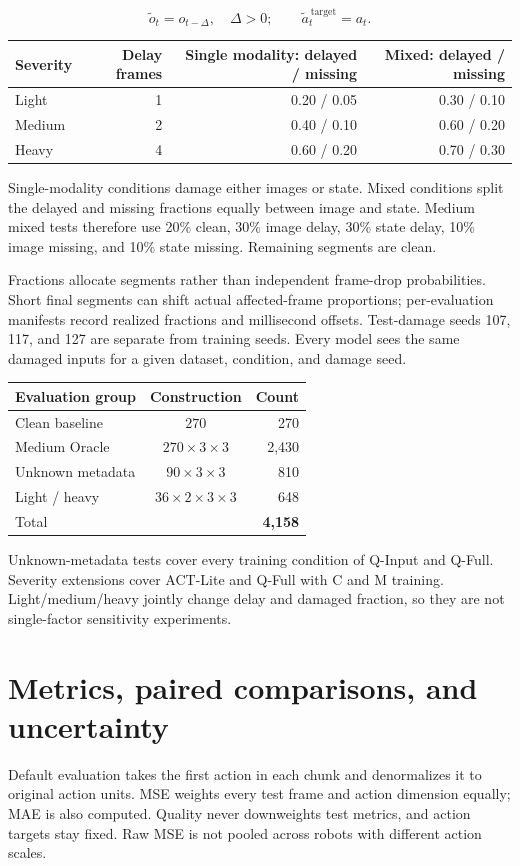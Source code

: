 \documentclass[11pt,a4paper]{article}
\begin{document}
\[\widetilde{o}_t=o_{t-\Delta},\quad \Delta>0;\qquad \widetilde{a}^{\,\mathrm{target}}_t=a_t.\]
\begin{center}
\footnotesize
\begin{tabular}{lrrr}
\toprule
Severity & Delay frames & Single modality: delayed / missing & Mixed: delayed / missing \\
\midrule
Light & 1 & 0.20 / 0.05 & 0.30 / 0.10 \\
Medium & 2 & 0.40 / 0.10 & 0.60 / 0.20 \\
Heavy & 4 & 0.60 / 0.20 & 0.70 / 0.30 \\
\bottomrule
\end{tabular}
\end{center}
Single-modality conditions damage either images or state. Mixed conditions split the delayed and missing fractions equally between image and state. Medium mixed tests therefore use 20\% clean, 30\% image delay, 30\% state delay, 10\% image missing, and 10\% state missing. Remaining segments are clean.

Fractions allocate segments rather than independent frame-drop probabilities. Short final segments can shift actual affected-frame proportions; per-evaluation manifests record realized fractions and millisecond offsets. Test-damage seeds 107, 117, and 127 are separate from training seeds. Every model sees the same damaged inputs for a given dataset, condition, and damage seed.

\begin{center}
\small
\begin{tabular}{lcr}
\toprule
Evaluation group & Construction & Count \\
\midrule
Clean baseline & $270$ & 270 \\
Medium Oracle & $270\times3\times3$ & 2,430 \\
Unknown metadata & $90\times3\times3$ & 810 \\
Light / heavy & $36\times2\times3\times3$ & 648 \\
Total &  & \textbf{4,158} \\
\bottomrule
\end{tabular}
\end{center}
Unknown-metadata tests cover every training condition of Q-Input and Q-Full. Severity extensions cover ACT-Lite and Q-Full with C and M training. Light/medium/heavy jointly change delay and damaged fraction, so they are not single-factor sensitivity experiments.
\clearpage\section{Metrics, paired comparisons, and uncertainty}
Default evaluation takes the first action in each chunk and denormalizes it to original action units. MSE weights every test frame and action dimension equally; MAE is also computed. Quality never downweights test metrics, and action targets stay fixed. Raw MSE is not pooled across robots with different action scales.
\end{document}
